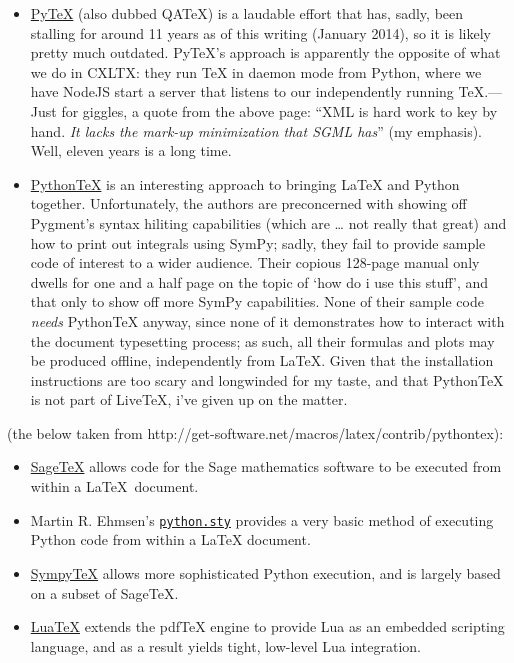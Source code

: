\begin{itemize}
\item
  \href{http://www.pytex.org/}{PyTeX} (also dubbed QATeX) is a laudable
  effort that has, sadly, been stalling for around 11 years as of this
  writing (January 2014), so it is likely pretty much outdated. PyTeX's
  approach is apparently the opposite of what we do in CXLTX: they run
  TeX in daemon mode from Python, where we have NodeJS start a server
  that listens to our independently running TeX.---Just for giggles, a
  quote from the above page: ``XML is hard work to key by hand. \emph{It
  lacks the mark-up minimization that SGML has}'' (my emphasis). Well,
  eleven years is a long time.
\item
  \href{https://github.com/gpoore/pythontex}{PythonTeX} is an
  interesting approach to bringing LaTeX and Python together.
  Unfortunately, the authors are preconcerned with showing off Pygment's
  syntax hiliting capabilities (which are \ldots{} not really that
  great) and how to print out integrals using SymPy; sadly, they fail to
  provide sample code of interest to a wider audience. Their copious
  128-page manual only dwells for one and a half page on the topic of
  `how do i use this stuff', and that only to show off more SymPy
  capabilities. None of their sample code \emph{needs} PythonTeX anyway,
  since none of it demonstrates how to interact with the document
  typesetting process; as such, all their formulas and plots may be
  produced offline, independently from LaTeX. Given that the
  installation instructions are too scary and longwinded for my taste,
  and that PythonTeX is not part of LiveTeX, i've given up on the
  matter.
\end{itemize}

(the below taken from
http://get-software.net/macros/latex/contrib/pythontex):

\begin{itemize}
\item
  \href{http://www.ctan.org/tex-archive/macros/latex/contrib/sagetex}{SageTeX}
  allows code for the Sage mathematics software to be executed from
  within a \LaTeX~document.
\item
  Martin R. Ehmsen's
  \href{http://www.ctan.org/pkg/python}{\texttt{python.sty}} provides a
  very basic method of executing Python code from within a LaTeX
  document.
\item
  \href{http://elec.otago.ac.nz/w/index.php/SympyTeX}{SympyTeX} allows
  more sophisticated Python execution, and is largely based on a subset
  of SageTeX.
\item
  \href{http://www.luatex.org/}{LuaTeX} extends the pdfTeX engine to
  provide Lua as an embedded scripting language, and as a result yields
  tight, low-level Lua integration.
\end{itemize}

